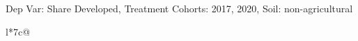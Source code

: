 \begin{table}[H]
\captionlistentry[table]{}
\label{table:beaver_land_class_DVis_land_class_3_SCg23_SSNAG}
\scriptsize %
Dep Var: Share Developed, Treatment Cohorts: 2017, 2020, Soil: non-agricultural \\
\begin{threeparttable}
\begin{tabulary}{\textwidth}{l*{7}{c}@{}}
\toprule \toprule
\noalign{\smallskip}
\noalign{\smallskip}
\midrule \bottomrule
\end{tabulary}
\medskip
\end{threeparttable}
\end{table}
